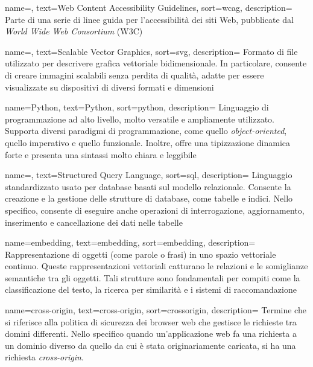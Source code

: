  {
    name=,
    text=Web Content Accessibility Guidelines,
    sort=wcag,
    description=
    {Parte di una serie di linee guida per l'accessibilità dei siti Web, pubblicate dal \emph{World Wide Web Consortium} (W3C)}
}

 {
    name=,
    text=Scalable Vector Graphics,
    sort=svg,
    description=
        {Formato di file utilizzato per descrivere grafica vettoriale bidimensionale. 
        In particolare, consente di creare immagini scalabili senza perdita di qualità, adatte per essere visualizzate su 
        dispositivi di diversi formati e dimensioni}
}

 {
    name=Python,
    text=Python,
    sort=python,
    description=
    {Linguaggio di programmazione ad alto livello, molto versatile e ampliamente utilizzato.
    Supporta diversi paradigmi di programmazione, come quello \emph{object-oriented}, quello imperativo e quello funzionale.
    Inoltre, offre una tipizzazione dinamica forte e presenta una sintassi molto chiara e leggibile}
}

 {
    name=,
    text=Structured Query Language,
    sort=sql,
    description=
    {Linguaggio standardizzato usato per database basati sul modello relazionale.
    Consente la creazione e la gestione delle strutture di database, come tabelle e indici. Nello specifico, consente di eseguire anche operazioni di 
    interrogazione, aggiornamento, inserimento e cancellazione dei dati nelle tabelle}
}

 {
    name=embedding,
    text=embedding,
    sort=embedding,
    description=
    {Rappresentazione di oggetti (come parole o frasi) in uno spazio vettoriale continuo. Queste rappresentazioni vettoriali catturano le relazioni e le somiglianze semantiche tra gli oggetti.
    Tali strutture sono fondamentali per compiti come la classificazione del testo, la ricerca per similarità e i sistemi di raccomandazione}
}

 {
    name=cross-origin,
    text=cross-origin,
    sort=crossorigin,
    description=
    {Termine che si riferisce alla politica di sicurezza dei browser web che gestisce le richieste tra domini differenti. 
    Nello specifico quando un'applicazione web fa una richiesta a un dominio diverso da quello da cui è stata originariamente caricata, si ha una richiesta \emph{cross-origin}.}
}

